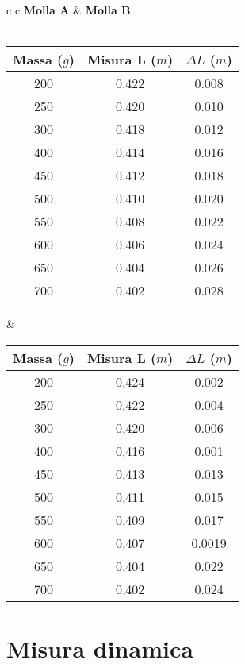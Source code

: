 \begin{center}

\begin{tabular}{c c}
\textbf{Molla A} & \hspace{2cm} \textbf{Molla B}\\
\\
\begin{tabular}{c|c|c}
Massa ($g$) & Misura L ($m$) & $\Delta L$ ($m$)\\
\midrule
200 & 0.422 & 0.008\\
250 & 0.420 & 0.010\\
300 & 0.418 & 0.012\\
400 & 0.414 & 0.016\\
450 & 0.412 & 0.018\\
500 & 0.410 & 0.020\\
550 & 0.408 & 0.022\\
600 & 0.406 & 0.024\\
650 & 0.404 & 0.026\\
700 & 0.402 & 0.028\\
\end{tabular}

& \hspace{2cm}

\begin{tabular}{c|c|c}
Massa ($g$) & Misura L ($m$) & $\Delta L$ ($m$)\\
\midrule
200 & 0,424 & 0.002\\
250 & 0,422 & 0.004\\
300 & 0,420 & 0.006\\
400 & 0,416 & 0.001\\
450 & 0,413 & 0.013\\
500 & 0,411 & 0.015\\
550 & 0,409 & 0.017\\
600 & 0,407 & 0.0019\\
650 & 0,404 & 0.022\\
700 & 0,402 & 0.024\\
\end{tabular}

\end{tabular}

\end{center}


\section{Misura dinamica}

